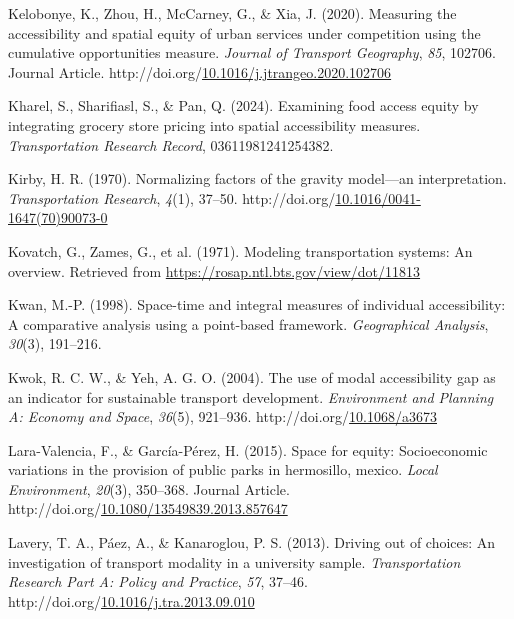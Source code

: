 \documentclass[
11pt, %
oneside, %
english, %
singlespacing, %
]{macthesis} %
\newlength{\cslhangindent}
\newenvironment{CSLReferences}[2] %
{\begin{list}{}{%
	\setlength{\itemindent}{0pt}
	\setlength{\leftmargin}{0pt}
	\setlength{\parsep}{0pt}
	\ifodd #1
	\setlength{\leftmargin}{\cslhangindent}
	\setlength{\itemindent}{-1\cslhangindent}
	\fi
	\setlength{\itemsep}{#2\baselineskip}}}
{\end{list}}
\begin{document}
\begin{CSLReferences}{1}{0}
Kelobonye, K., Zhou, H., McCarney, G., \& Xia, J. (2020). Measuring the accessibility and spatial equity of urban services under competition using the cumulative opportunities measure. \emph{Journal of Transport Geography}, \emph{85}, 102706. Journal Article. http://doi.org/\href{https://doi.org/10.1016/j.jtrangeo.2020.102706}{10.1016/j.jtrangeo.2020.102706}

Kharel, S., Sharifiasl, S., \& Pan, Q. (2024). Examining food access equity by integrating grocery store pricing into spatial accessibility measures. \emph{Transportation Research Record}, 03611981241254382.

Kirby, H. R. (1970). Normalizing factors of the gravity model---an interpretation. \emph{Transportation Research}, \emph{4}(1), 37--50. http://doi.org/\href{https://doi.org/10.1016/0041-1647(70)90073-0}{10.1016/0041-1647(70)90073-0}

Kovatch, G., Zames, G., et al. (1971). Modeling transportation systems: An overview. Retrieved from \url{https://rosap.ntl.bts.gov/view/dot/11813}

Kwan, M.-P. (1998). Space-time and integral measures of individual accessibility: A comparative analysis using a point-based framework. \emph{Geographical Analysis}, \emph{30}(3), 191--216.

Kwok, R. C. W., \& Yeh, A. G. O. (2004). The use of modal accessibility gap as an indicator for sustainable transport development. \emph{Environment and Planning A: Economy and Space}, \emph{36}(5), 921--936. http://doi.org/\href{https://doi.org/10.1068/a3673}{10.1068/a3673}

Lara-Valencia, F., \& García-Pérez, H. (2015). Space for equity: Socioeconomic variations in the provision of public parks in hermosillo, mexico. \emph{Local Environment}, \emph{20}(3), 350--368. Journal Article. http://doi.org/\href{https://doi.org/10.1080/13549839.2013.857647}{10.1080/13549839.2013.857647}

Lavery, T. A., Páez, A., \& Kanaroglou, P. S. (2013). Driving out of choices: {An} investigation of transport modality in a university sample. \emph{Transportation Research Part A: Policy and Practice}, \emph{57}, 37--46. http://doi.org/\href{https://doi.org/10.1016/j.tra.2013.09.010}{10.1016/j.tra.2013.09.010}


\end{CSLReferences}
\end{document}
